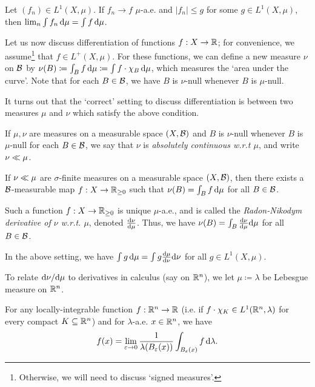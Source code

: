 \documentclass[reqno, twoside]{article}
\begin{document}
    \begin{theorem}
        Let $(f_n)\in L^1(X,\mu)$. If $f_n\to f$ $\mu$-a.e. and $|f_n|\leq g$ for some $g\in L^1(X,\mu)$, then $\lim_n\int f_n\,\mathrm{d}\mu=\int f\,\mathrm{d}\mu$.
    \end{theorem}

    Let us now discuss differentiation of functions $f:X\to\mathbb{R}$; for convenience, we assume\footnote{Otherwise, we will need to discuss `signed measures'.} that $f\in L^+(X,\mu)$. For these functions, we can define a new measure $\nu$ on $\mathcal{B}$ by $\nu(B)\coloneqq\int_Bf\,\mathrm{d}\mu\coloneqq\int f\cdot\chi_B\,\mathrm{d}\mu$, which measures the `area under the curve'. Note that for each $B\in\mathcal{B}$, we have $B$ is $\nu$-null whenever $B$ is $\mu$-null.

    It turns out that the `correct' setting to discuss differentiation is between two measures $\mu$ and $\nu$ which satisfy the above condition.

    \begin{definition}
        If $\mu,\nu$ are measures on a measurable space $(X,\mathcal{B})$ and $B$ is $\nu$-null whenever $B$ is $\mu$-null for each $B\in\mathcal{B}$, we say that $\nu$ is \textit{absolutely continuous w.r.t $\mu$}, and write $\nu\ll\mu$.
    \end{definition}

    \begin{theorem}
        If $\nu\ll\mu$ are $\sigma$-finite measures on a measurable space $(X,\mathcal{B})$, then there exists a $\mathcal{B}$-measurable map $f:X\to\mathbb{R}_{\geq0}$ such that $\nu(B)=\int_Bf\,\mathrm{d}\mu$ for all $B\in\mathcal{B}$.
    \end{theorem}

    Such a function $f:X\to\mathbb{R}_{\geq0}$ is unique $\mu$-a.e., and is called the \textit{Radon-Nikodym derivative of $\nu$ w.r.t. $\mu$}, denoted $\frac{\mathrm{d}\nu}{\mathrm{d}\mu}$. Thus, we have $\nu(B)=\int_B\frac{\mathrm{d}\nu}{\mathrm{d}\mu}\mathrm{d}\mu$ for all $B\in\mathcal{B}$.

    \begin{corollary}
        In the above setting, we have $\int g\,\mathrm{d}\mu=\int g\frac{\mathrm{d}\mu}{\mathrm{d}\nu}\mathrm{d}\nu$ for all $g\in L^1(X,\mu)$.
    \end{corollary}

    To relate $\mathrm{d}\nu/\mathrm{d}\mu$ to derivatives in calculus (say on $\mathbb{R}^n$), we let $\mu\coloneqq\lambda$ be Lebesgue measure on $\mathbb{R}^n$.

    \begin{theorem}
        For any locally-integrable function $f:\mathbb{R}^n\to\mathbb{R}$ (i.e. if $f\cdot\chi_K\in L^1(\mathbb{R}^n,\lambda)$ for every compact $K\subseteq\mathbb{R}^n$) and for $\lambda$-a.e. $x\in\mathbb{R}^n$, we have
        \vspace{-0.05in}
        \begin{equation*}
            f(x)=\lim_{\epsilon\to0}\frac{1}{\lambda(B_\epsilon(x))}\int_{B_\epsilon(x)}f\,\d\lambda.
            \vspace{-0.05in}
        \end{equation*}
    \end{theorem}
\end{document}
